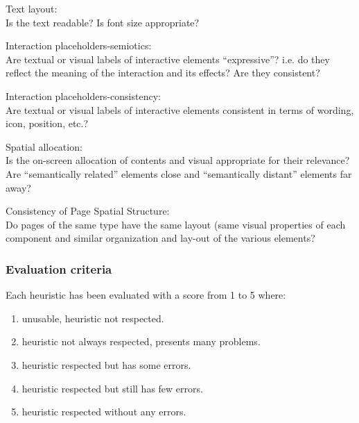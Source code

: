 \documentclass[11pt, letterpaper]{article}
\begin{document}
\begin{MP}
    \item Text layout: \\
            Is the text readable? Is font size appropriate? 
    \item Interaction placeholders-semiotics: \\
            Are textual or visual labels of interactive elements “expressive”? i.e. do they reflect the meaning of the interaction and its effects? Are they consistent? 
    \item Interaction placeholders-consistency: \\
            Are textual or visual labels of interactive elements consistent in terms of wording, icon, position, etc.?
    \item Spatial allocation: \\
            Is the on-screen allocation of contents and visual appropriate for their relevance? Are “semantically related” elements close and “semantically distant” elements far away? 
    \item Consistency of Page Spatial Structure: \\
            Do pages of the same type have the same layout (same visual properties of each component and similar organization and lay-out of the various elements?
\end{MP}

\subsubsection{Evaluation criteria}
Each heuristic has been evaluated with a score from 1 to 5 where: 
\begin{enumerate}
    \item unusable, heuristic not respected.
    \item heuristic not always respected, presents many problems.
    \item heuristic respected but has some errors.
    \item heuristic respected but still has few errors.
    \item heuristic respected without any errors.
\end{enumerate}
\end{document}
